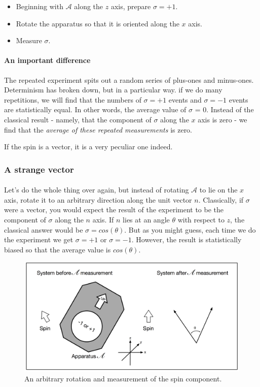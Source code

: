 \documentclass[a4paper,10pt]{article}
\begin{document}
\begin{itemize}
    \item Beginning with $\mathcal{A}$ along the $z$ axis, prepare $\sigma = +1$.
    \item Rotate the apparatus so that it is oriented along the $x$ axis.
    \item Measure $\sigma$.
\end{itemize}

\paragraph{An important difference} The repeated experiment spits out a random series of plus-ones and minus-ones. Determinism has broken down, but in a particular way. if we do many repetitions, we will find that the numbers of $\sigma = +1$ events and $\sigma = -1$ events are statistically equal. In other words, the average value of $\sigma$ = 0. Instead of the classical result - namely, that the component of $\sigma$ along the $x$ axis is zero - we find that the \textit{average of these repeated measurements} is zero. 

If the spin is a vector, it is a very peculiar one indeed.

\subsubsection{A strange vector}

\paragraph{} Let's do the whole thing over again, but instead of rotating $\mathcal{A}$ to lie on the $x$ axis, rotate it to an arbitrary direction along the unit vector $n$. Classically, if $\sigma$ were a vector, you would expect the result of the experiment to be the component of $\sigma$ along the $n$ axis. If $n$ lies at an angle $\theta$ with respect to $z$, the classical answer would be $\sigma = cos(\theta)$. But as you might guess, each time we do the experiment we get $\sigma = +1$ or $\sigma = -1$. However, the result is statistically biased so that the average value is $cos(\theta)$.

\begin{figure}[!htb]
\begin{center}
\includegraphics[width=4.55in]{images/spinExp4.png}
\caption{An arbitrary rotation and measurement of the spin component.}
\label{fig:spinExp4}
\end{center}
\end{figure}
\end{document}
